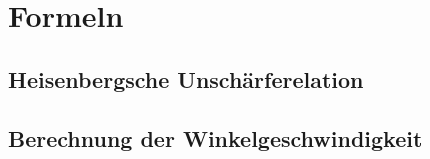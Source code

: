 \chapter{Formeln}
\label{ch:formulas}

\blindtext

\section{Heisenbergsche Unschärferelation}
\label{sec:formulas:heisenberg}

\blindtext

\section{Berechnung der Winkelgeschwindigkeit}
\label{sec:formulas:angular_velocity}

\blindtext